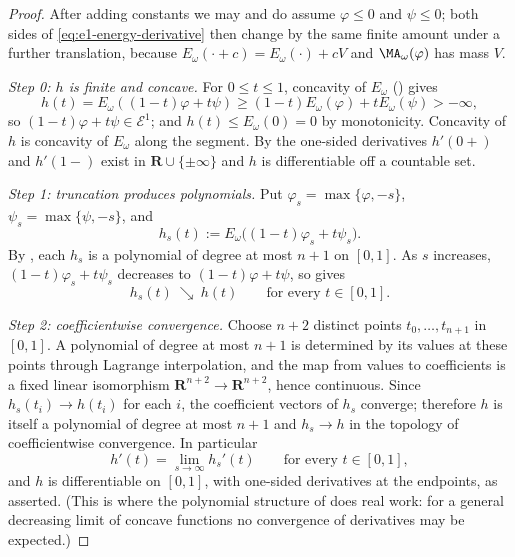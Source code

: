 \begin{proof}
After adding constants we may and do assume \(\varphi\leq0\) and
\(\psi\leq0\); both sides of \eqref{eq:e1-energy-derivative} then change by
the same finite amount under a further translation, because
\(E_\omega(\cdot+c)=E_\omega(\cdot)+cV\) and
\(\MA_\omega(\varphi)\) has mass \(V\).

\emph{Step 0: \(h\) is finite and concave.}
For \(0\leq t\leq1\), concavity of \(E_\omega\)
() gives
\[
 h(t)=E_\omega((1-t)\varphi+t\psi)
 \geq(1-t)E_\omega(\varphi)+tE_\omega(\psi)>-\infty ,
\]
so \((1-t)\varphi+t\psi\in\mathcal E^1\); and \(h(t)\leq E_\omega(0)=0\)
by monotonicity.  Concavity of \(h\) is concavity of \(E_\omega\) along the
segment.  By  the one-sided derivatives
\(h'(0+)\) and \(h'(1-)\) exist in \(\mathbf R\cup\{\pm\infty\}\) and
\(h\) is differentiable off a countable set.

\emph{Step 1: truncation produces polynomials.}
Put \(\varphi_s=\max\{\varphi,-s\}\), \(\psi_s=\max\{\psi,-s\}\), and
\[
 h_s(t):=E_\omega\bigl((1-t)\varphi_s+t\psi_s\bigr).
\]
By , each \(h_s\) is a polynomial of
degree at most \(n+1\) on \([0,1]\).  As \(s\) increases,
\((1-t)\varphi_s+t\psi_s\) decreases to \((1-t)\varphi+t\psi\), so
 gives
\[
 h_s(t)\ \searrow\ h(t)
 \qquad\text{for every }t\in[0,1].
\]

\emph{Step 2: coefficientwise convergence.}
Choose \(n+2\) distinct points \(t_0,\dots,t_{n+1}\) in \([0,1]\).  A
polynomial of degree at most \(n+1\) is determined by its values at these
points through Lagrange interpolation, and the map from values to
coefficients is a fixed linear isomorphism
\(\mathbf R^{n+2}\to\mathbf R^{n+2}\), hence continuous.  Since
\(h_s(t_i)\to h(t_i)\) for each \(i\), the coefficient vectors of \(h_s\)
converge; therefore \(h\) is itself a polynomial of degree at most \(n+1\)
and \(h_s\to h\) in the topology of coefficientwise convergence.  In
particular
\begin{equation}\label{eq:ch27-derivative-limit}
 h'(t)=\lim_{s\to\infty}h_s'(t)
 \qquad\text{for every }t\in[0,1],
\end{equation}
and \(h\) is differentiable on \([0,1]\), with one-sided derivatives at the
endpoints, as asserted.  (This is where the polynomial structure of
 does real work: for a general decreasing
limit of concave functions no convergence of derivatives may be expected.)


\end{proof}
